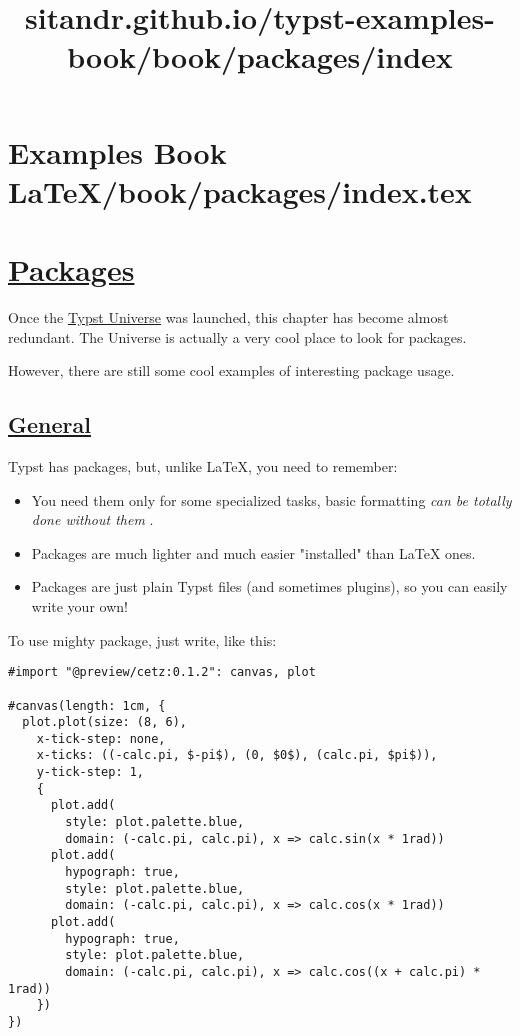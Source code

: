 \pandocbounded{}


\section{Examples Book LaTeX/book/packages/index.tex}
\title{sitandr.github.io/typst-examples-book/book/packages/index}

\section{\texorpdfstring{\hyperref[packages]{Packages}}{Packages}}\label{packages}

Once the \href{https://typst.app/universe}{Typst Universe} was launched,
this chapter has become almost redundant. The Universe is actually a
very cool place to look for packages.

However, there are still some cool examples of interesting package
usage.

\subsection{\texorpdfstring{\hyperref[general]{General}}{General}}\label{general}

Typst has packages, but, unlike LaTeX, you need to remember:

\begin{itemize}
\tightlist
\item
  You need them only for some specialized tasks, basic formatting
  \emph{can be totally done without them} .
\item
  Packages are much lighter and much easier "installed" than LaTeX ones.
\item
  Packages are just plain Typst files (and sometimes plugins), so you
  can easily write your own!
\end{itemize}

To use mighty package, just write, like this:

\begin{verbatim}
#import "@preview/cetz:0.1.2": canvas, plot

#canvas(length: 1cm, {
  plot.plot(size: (8, 6),
    x-tick-step: none,
    x-ticks: ((-calc.pi, $-pi$), (0, $0$), (calc.pi, $pi$)),
    y-tick-step: 1,
    {
      plot.add(
        style: plot.palette.blue,
        domain: (-calc.pi, calc.pi), x => calc.sin(x * 1rad))
      plot.add(
        hypograph: true,
        style: plot.palette.blue,
        domain: (-calc.pi, calc.pi), x => calc.cos(x * 1rad))
      plot.add(
        hypograph: true,
        style: plot.palette.blue,
        domain: (-calc.pi, calc.pi), x => calc.cos((x + calc.pi) * 1rad))
    })
})
\end{verbatim}

